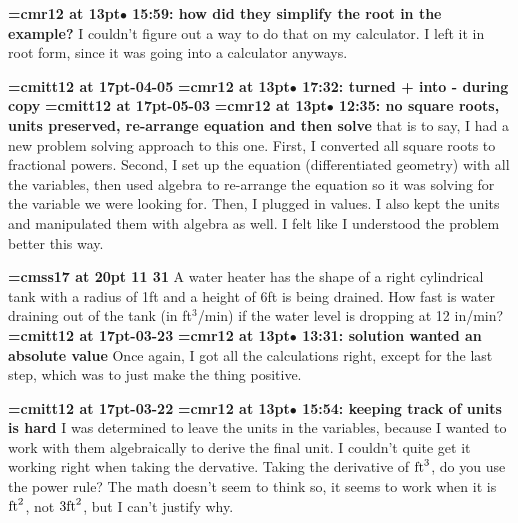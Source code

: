 {\smallskip\noindent\bf\font\titlefont=cmr12 at 13pt\titlefont $\bullet$ 15:59: how did they simplify the root in the example?}\smallskip
I couldn't figure out a way to do that on my calculator. I left it in root form, since it was going into a calculator anyways.
\par

{\medskip\noindent\bf\font\titlefont=cmitt12 at 17pt-04-05}\medskip
{\smallskip\noindent\bf\font\titlefont=cmr12 at 13pt\titlefont $\bullet$ 17:32: turned + into - during copy}\smallskip
{\medskip\noindent\bf\font\titlefont=cmitt12 at 17pt-05-03}\medskip
{\smallskip\noindent\bf\font\titlefont=cmr12 at 13pt\titlefont $\bullet$ 12:35: no square roots, units preserved, re-arrange equation and then solve}\smallskip
that is to say, I had a new problem solving approach to this one. First, I converted all square roots to fractional powers. Second, I set up the equation (differentiated geometry) with all the variables, then used algebra to re-arrange the equation so it was solving for the variable we were looking for. Then, I plugged in values. I also kept the units and manipulated them with algebra as well. I felt like I understood the problem better this way.
\par

{\medskip\noindent\bf\font\titlefont=cmss17 at 20pt 11 31}\medskip
A water heater has the shape of a right cylindrical tank
with a radius of 1ft and a height of 6ft is being drained.
How fast is water draining out of the tank (in ft$^3$/min) if
the water level is dropping at 12 in/min?
{\medskip\noindent\bf\font\titlefont=cmitt12 at 17pt-03-23}\medskip
{\smallskip\noindent\bf\font\titlefont=cmr12 at 13pt\titlefont $\bullet$ 13:31: solution wanted an absolute value}\smallskip
Once again, I got all the calculations right, except for the last step, which was to just make the thing positive.
\par

{\medskip\noindent\bf\font\titlefont=cmitt12 at 17pt-03-22}\medskip
{\smallskip\noindent\bf\font\titlefont=cmr12 at 13pt\titlefont $\bullet$ 15:54: keeping track of units is hard}\smallskip
I was determined to leave the units in the variables, because I wanted to work with them algebraically to derive the final unit. I couldn't quite get it working right when taking the dervative. Taking the derivative of $\hbox{ft}^3$, do you use the power rule? The math doesn't seem to think so, it seems to work when it is $\hbox{ft}^2$, not $3\hbox{ft}^2$, but I can't justify why.
\par

